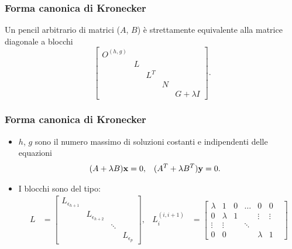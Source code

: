 \begin{frame}
	\frametitle{Forma canonica di Kronecker}
	\begin{theorem}
		Un pencil arbitrario di matrici ($A$, $B$)
		\`e strettamente equivalente alla matrice diagonale a blocchi
		\[
			\begin{bmatrix}
				O^{(h, g)} \\
				& L \\
				&& L^T \\
				&&& N \\
				&&&& G+\lambda I
			\end{bmatrix}.
		\]
	\end{theorem}
\end{frame}


\begin{frame}
	\frametitle{Forma canonica di Kronecker}
	\begin{itemize}
		\item $h$, $g$ sono il numero massimo di soluzioni costanti e indipendenti delle
		equazioni
		\begin{align*}
			(A + \lambda B)\vb{x} &= 0, & (A^T + \lambda B^T)\vb{y} &= 0.
		\end{align*}
		\item {} I blocchi sono del tipo:
		\begin{align*}
			L &= \left[\begin{smallmatrix}
				L_{\epsilon_{h+1}} \\
				& L_{\epsilon_{h+2}} \\
				& & \ddots \\
				& & & L_{\epsilon_{p}}
			\end{smallmatrix}\right], &
			L_{i}^{(i, i+1)} &= \left[\begin{smallmatrix}
				\lambda        &      1     &       0      &     \ldots       &    0       &    0   \\
				0              & \lambda    &       1      &                  & \vdots     & \vdots \\
				\vdots         & \vdots     &     & \ddots    &      &            &        \\
				0              &      0     &              &                  & \lambda    &    1   
			\end{smallmatrix}\right]
		\end{align*}
	\end{itemize}
\end{frame}


